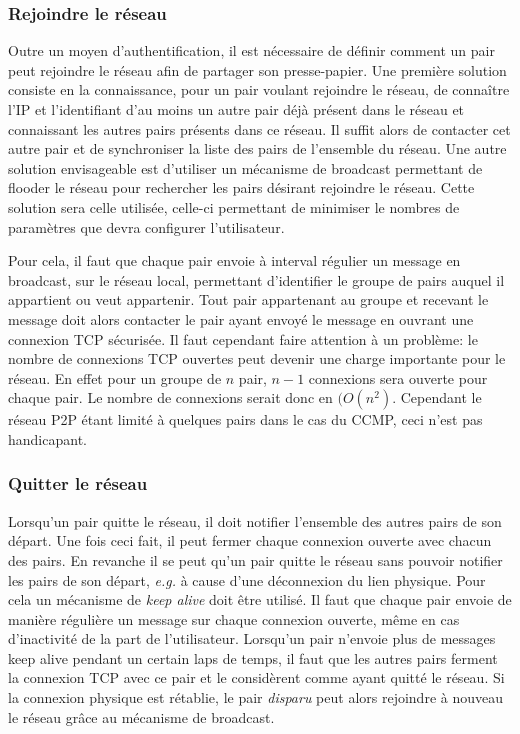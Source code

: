 \subsubsection*{Rejoindre le réseau}
Outre un moyen d'authentification, il est nécessaire de définir comment
un pair peut rejoindre le réseau afin de partager son presse-papier.
Une première solution consiste en la connaissance, pour un pair voulant
rejoindre le réseau, de connaître l'IP et l'identifiant d'au moins un autre
pair déjà présent dans le réseau et connaissant les autres pairs présents
dans ce réseau. Il suffit alors de contacter cet autre pair et de synchroniser
la  liste des pairs de l'ensemble du réseau. Une autre solution envisageable
est d'utiliser un mécanisme de broadcast permettant de flooder le réseau pour
rechercher les pairs désirant rejoindre le réseau. Cette solution sera celle
utilisée, celle-ci permettant de minimiser le nombres de paramètres que devra
configurer l'utilisateur.

Pour cela, il faut que chaque pair envoie à interval régulier un message
en broadcast, sur le réseau local, permettant d'identifier le groupe de pairs
auquel il appartient ou veut appartenir. Tout pair appartenant au groupe et
recevant le message doit alors contacter le pair ayant envoyé le message en
ouvrant une connexion TCP sécurisée. Il faut cependant faire attention à un
problème: le nombre de connexions TCP ouvertes peut devenir une charge
importante pour le réseau. En effet pour un groupe de $n$ pair, $n-1$
connexions sera ouverte pour chaque pair. Le nombre de connexions serait donc
en $(O(n^2)$. Cependant le réseau P2P étant limité à quelques pairs dans le
cas du CCMP, ceci n'est pas handicapant.

\subsubsection*{Quitter le réseau}
Lorsqu'un pair quitte le réseau, il doit notifier l'ensemble des autres
pairs de son départ. Une fois ceci fait, il peut fermer chaque connexion
ouverte avec chacun des pairs. En revanche il se peut qu'un pair quitte
le réseau sans pouvoir notifier les pairs de son départ, \emph{e.g.}
à cause d'une déconnexion du lien physique. Pour cela un mécanisme
de \emph{keep alive} doit être utilisé. Il faut que chaque pair envoie
de manière régulière un message sur chaque connexion ouverte, même en cas
d'inactivité de la part de l'utilisateur. Lorsqu'un pair n'envoie plus
de messages keep alive pendant un certain laps de temps, il faut que les
autres pairs ferment la connexion TCP avec ce pair et le considèrent comme
ayant quitté le réseau. Si la connexion physique est rétablie, le pair
\emph{disparu} peut alors rejoindre à nouveau le réseau grâce au mécanisme
de broadcast.

